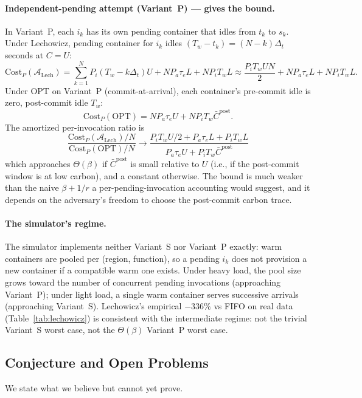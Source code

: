 \paragraph{Independent-pending attempt (Variant~P) — gives the bound.}
In Variant~P, each $i_k$ has its own pending container that idles
from $t_k$ to $s_k$. Under Lechowicz, pending container for $i_k$
idles $(T_w - t_k) = (N-k)\Delta_t$ seconds at $C = U$:
\[
\mathrm{Cost}_P(\mathcal{A}_{\text{Lech}}) = \sum_{k=1}^{N} P_i (T_w - k\Delta_t) U
 + N P_a \tau_e L + N P_i T_w L
 \approx \frac{P_i T_w U N}{2} + N P_a \tau_e L + N P_i T_w L.
\]
Under OPT on Variant~P (commit-at-arrival), each container's
pre-commit idle is zero, post-commit idle $T_w$:
\[
\mathrm{Cost}_P(\mathrm{OPT}) = N P_a \tau_e U + N P_i T_w \bar{C}^{\mathrm{post}}.
\]
The amortized per-invocation ratio is
\[
\frac{\mathrm{Cost}_P(\mathcal{A}_{\text{Lech}})/N}{\mathrm{Cost}_P(\mathrm{OPT})/N}
\to \frac{P_i T_w U / 2 + P_a \tau_e L + P_i T_w L}{P_a \tau_e U + P_i T_w \bar{C}^{\mathrm{post}}}
\]
which approaches $\Theta(\beta)$ if $\bar{C}^{\mathrm{post}}$ is small
relative to $U$ (i.e., if the post-commit window is at low carbon),
and a constant otherwise. The bound is much weaker than the naive
$\beta + 1/r$ a per-pending-invocation accounting would suggest, and
it depends on the adversary's freedom to choose the post-commit
carbon trace.

\paragraph{The simulator's regime.} The simulator implements neither
Variant~S nor Variant~P exactly: warm containers are pooled per
(region, function), so a pending $i_k$ does not provision a new
container if a compatible warm one exists. Under heavy load, the pool
size grows toward the number of concurrent pending invocations
(approaching Variant~P); under light load, a single warm container
serves successive arrivals (approaching Variant~S). Lechowicz's
empirical $-336\%$ vs FIFO on real data
(Table~\ref{tab:lechowicz}) is consistent with the intermediate
regime: not the trivial Variant~S worst case, not the
$\Theta(\beta)$ Variant~P worst case.

\subsection{Conjecture and Open Problems}
\label{sec:theory:conjecture}

We state what we believe but cannot yet prove.

